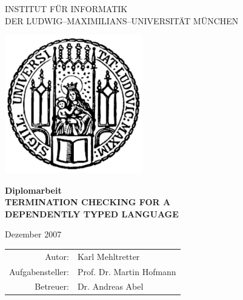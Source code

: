 \documentclass[a4paper,11pt]{report}
\theoremstyle{remark}
\begin{document}
\begin{titlepage}
\begin{center}


\vspace*{-2cm}

{\Huge INSTITUT F\"UR INFORMATIK\\[1mm]} %
DER LUDWIG--MAXIMILIANS--UNIVERSIT\"AT M\"UNCHEN\\

\vspace*{1cm}

\includegraphics[width=0.45\textwidth]{siegel.pdf}

\vspace*{2cm}

{\LARGE \textbf{Diplomarbeit}}\\

\vspace{2.0cm}
{\LARGE \textbf{TERMINATION CHECKING FOR A}}\\
\vspace*{3mm}
{\LARGE \textbf{DEPENDENTLY TYPED LANGUAGE}}\\

\vspace{2cm}

\Large{Dezember 2007}

\vspace{1.5cm}

  \begin{Large}
  \begin{tabular}{rl}
      Autor: &Karl Mehltretter\\
      Aufgabensteller: & Prof. Dr. Martin Hofmann\\
      Betreuer: & Dr. Andreas Abel\\
  \end{tabular}
  \end{Large}
\end{center}
\
\end{titlepage} 
\end{document}
